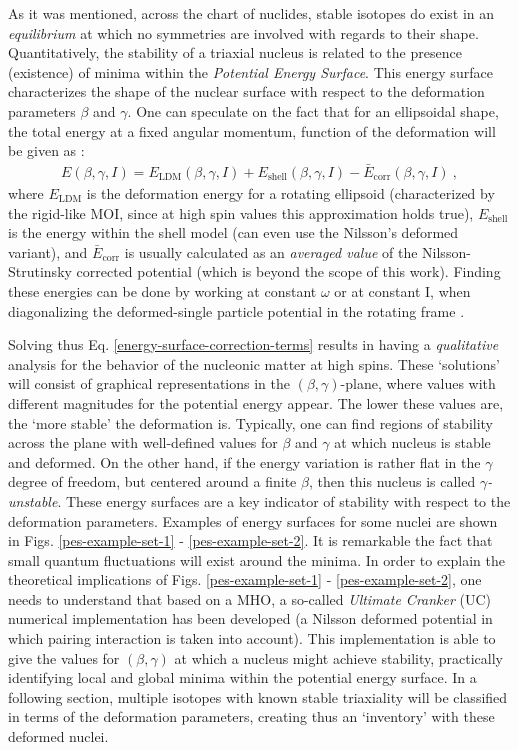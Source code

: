 As it was mentioned, across the chart of nuclides, stable isotopes do exist in an \emph{equilibrium} at which no symmetries are involved with regards to their shape. Quantitatively, the stability of a triaxial nucleus is related to the presence (existence) of minima within the \emph{Potential Energy Surface}. This energy surface characterizes the shape of the nuclear surface with respect to the deformation parameters $\beta$ and $\gamma$. One can speculate on the fact that for an ellipsoidal shape, the total energy at a fixed angular momentum, function of the deformation will be given as \cite{ring2004nuclear}:
\begin{align}
    E(\beta,\gamma,I)=E_\text{LDM}(\beta,\gamma,I)+E_\text{shell}(\beta,\gamma,I)-\bar{E}_\text{corr}(\beta,\gamma,I)\ ,
    \label{energy-surface-correction-terms}
\end{align}
where $E_\text{LDM}$ is the deformation energy for a rotating ellipsoid (characterized by the rigid-like MOI, since at high spin values this approximation holds true), $E_\text{shell}$ is the energy within the shell model (can even use the Nilsson's deformed variant), and $\bar{E}_\text{corr}$ is usually calculated as an \emph{averaged value} of the Nilsson-Strutinsky corrected potential \cite{brack1972funny} (which is beyond the scope of this work). Finding these energies can be done by working at constant $\omega$ or at constant I, when diagonalizing the deformed-single particle potential in the rotating frame \cite{ring2004nuclear}.

Solving thus Eq. \ref{energy-surface-correction-terms} results in having a \emph{qualitative} analysis for the behavior of the nucleonic matter at high spins. These `solutions' will consist of graphical representations in the $(\beta,\gamma)$-plane, where values with different magnitudes for the potential energy appear. The lower these values are, the `more stable' the deformation is. Typically, one can find regions of stability across the plane with well-defined values for $\beta$ and $\gamma$ at which nucleus is stable and deformed. On the other hand, if the energy variation is rather flat in the $\gamma$ degree of freedom, but centered around a finite $\beta$, then this nucleus is called \emph{$\gamma$-unstable}. These energy surfaces are a key indicator of stability with respect to the deformation parameters. Examples of energy surfaces for some nuclei are shown in Figs. \ref{pes-example-set-1} - \ref{pes-example-set-2}. It is remarkable the fact that small quantum fluctuations will exist around the minima.
In order to explain the theoretical implications of Figs. \ref{pes-example-set-1} - \ref{pes-example-set-2}, one needs to understand that based on a MHO, a so-called \emph{Ultimate Cranker} (UC) numerical implementation has been developed \cite{bengtsson1989method,bengtsson1990high} (a Nilsson deformed potential in which pairing interaction is taken into account). This implementation is able to give the values for $(\beta,\gamma)$ at which a nucleus might achieve stability, practically identifying local and global minima within the potential energy surface. In a following section, multiple isotopes with known stable triaxiality will be classified in terms of the deformation parameters, creating thus an `inventory' with these deformed nuclei.

